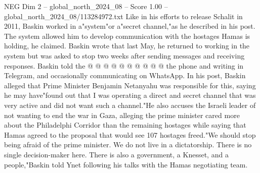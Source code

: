 \begin{textsample}{NEG Dim 2 – global\_north\_2024\_08 – Score 1.00 – global\_north\_2024\_08/113284972.txt}
Like in his efforts to release Schalit in 2011, Baskin worked in a"system"or a"secret channel,"as he described in his post.
The system allowed him to develop communication with the hostages Hamas is holding, he claimed.
Baskin wrote that last May, he returned to working in the system but was asked to stop two weeks after sending messages and receiving responses.
Baskin told the @ @ @ @ @ @ @ @ @ @ the phone and writing in Telegram, and occasionally communicating on WhatsApp.
In his post, Baskin alleged that Prime Minister Benjamin Netanyahu was responsible for this, saying he may have"found out that I was operating a direct and secret channel that was very active and did not want such a channel."He also accuses the Israeli leader of not wanting to end the war in Gaza, alleging the prime minister cared more about the Philadelphi Corridor than the remaining hostages while saying that Hamas agreed to the proposal that would see 107 hostages freed."We should stop being afraid of the prime minister.
We do not live in a dictatorship.
There is no single decision-maker here.
There is also a government, a Knesset, and a people,"Baskin told Ynet following his talks with the Hamas negotiating team.

\end{textsample}
